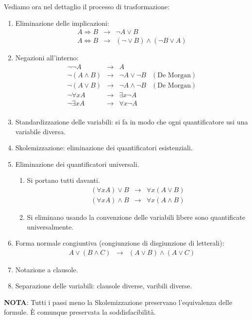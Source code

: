 Vediamo ora nel dettaglio il processo di trasformazione:
\begin{enumerate}
	\item Eliminazione delle implicazioni:
	      \[
		      \begin{array}{rcl}
			      A \Rightarrow B     & \rightarrow & \lnot A \vee B                         \\
			      A \Leftrightarrow B & \rightarrow & (\lnot \vee B) \wedge (\lnot B \vee A)
		      \end{array}
	      \]
	\item Negazioni all'interno:
	      \[
		      \begin{array}{rclr}
			      \lnot \lnot A      & \rightarrow & A                      &                    \\
			      \lnot (A \wedge B) & \rightarrow & \lnot A \vee \lnot B   & (\text{De Morgan}) \\
			      \lnot (A \vee B)   & \rightarrow & \lnot A \wedge \lnot B & (\text{De Morgan}) \\
			      \lnot \forall x A  & \rightarrow & \exists x \lnot A      &                    \\
			      \lnot \exists x A  & \rightarrow & \forall x \lnot A      &                    \\
		      \end{array}
	      \]
	\item Standardizzazione delle variabili: si fa in modo che ogni quantificatore usi una variabile diversa.
	\item Skolemizzazione: eliminazione dei quantificatori esistenziali.
	\item Eliminazione dei quantificatori universali.
	      \begin{enumerate}
		      \item Si portano tutti davanti.
		            \[
			            \begin{array}{rcl}
				            (\forall x A) \vee B   & \rightarrow & \forall x (A \vee B)   \\
				            (\forall x A) \wedge B & \rightarrow & \forall x (A \wedge B)
			            \end{array}
		            \]
		      \item Si eliminano usando la convenzione delle variabili libere sono quantificate universalmente.
	      \end{enumerate}
	\item Forma normale congiuntiva (congiunzione di disgiunzione di letterali):
	      \[
		      \begin{array}{rcl}
			      A \vee (B \wedge C) & \rightarrow & (A \vee B) \wedge (A \vee C)
		      \end{array}
	      \]
	\item Notazione a clausole.
	\item Separazione delle variabili: clausole diverse, varibili diverse.
\end{enumerate}
\textbf{NOTA}: Tutti i passi meno la Skolemizzazione preservano l'equivalenza delle formule. \`E comunque
preservata la soddisfacibilit\`a.

